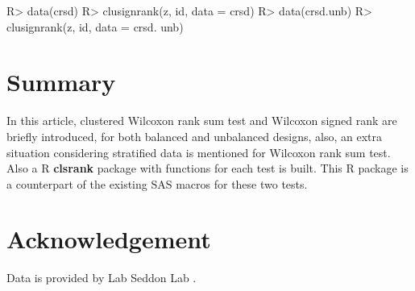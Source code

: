 \documentclass[article]{jss}
\begin{document}
\begin{CodeChunk} 
\begin{CodeInput}
R> data(crsd)
R> clusignrank(z, id, data = crsd)
R> data(crsd.unb)
R> clusignrank(z, id, data = crsd. unb)
\end{CodeInput}
\end{CodeChunk}



\section{Summary}
In this article, clustered Wilcoxon rank sum test and Wilcoxon signed rank are briefly introduced, for both balanced and unbalanced designs, also, an extra situation considering stratified data is mentioned for Wilcoxon rank sum test. Also a R \textbf{clsrank} package with functions for each test is built. This R package is a counterpart of the existing SAS macros for these two tests. 

\section*{Acknowledgement}
Data  is provided by Lab Seddon Lab \citep{ferrara2015pheno}.%



\end{document}
